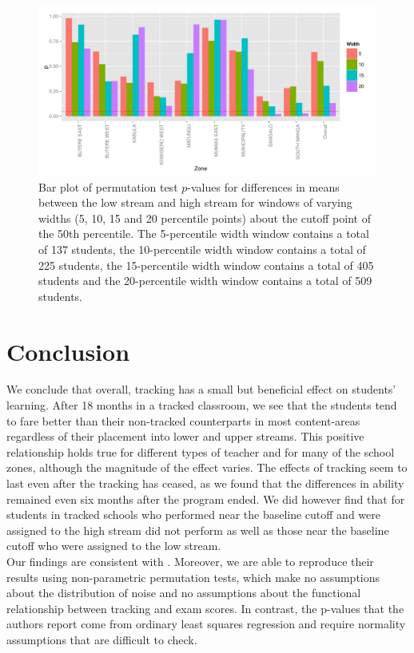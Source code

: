 \documentclass[11pt]{article}
\begin{document}
  \begin{figure}[H]
 \centering
 \includegraphics[scale=0.6]{RD_pval.pdf}
 \caption{Bar plot of permutation test $p$-values for differences in means between the low stream and high stream for windows of varying widths (5, 10, 15 and 20 percentile points) about the cutoff point of the 50th percentile. The 5-percentile width window contains a total of 137 students, the 10-percentile width window contains a total of 225 students, the 15-percentile width window contains a total of 405 students and the 20-percentile width window contains a total of 509 students.}
 \label{fig:pval_window}
 \end{figure}
 
 
 
 
 
 
\section{Conclusion}
We conclude that overall, tracking has a small but beneficial effect on students' learning.  After 18 months in a tracked classroom, we see that the students tend to fare better than their non-tracked counterparts in most content-areas regardless of their placement into lower and upper streams.  This positive relationship holds true for different types of teacher and for many of the school zones, although the magnitude of the effect varies. The effects of tracking seem to last even after the tracking has ceased, as we found that the differences in ability remained even six months after the program ended. We did however find that for students in tracked schools who performed near the baseline cutoff and were assigned to the high stream did not perform as well as those near the baseline cutoff who were assigned to the low stream. \\

Our findings are consistent with \cite{duflo2011}. Moreover, we are able to reproduce their results using non-parametric permutation tests, which make no assumptions about the distribution of noise and no assumptions about the functional relationship between tracking and exam scores. In contrast, the p-values that the authors report come from ordinary least squares regression and require normality assumptions that are difficult to check.



 
\end{document}
